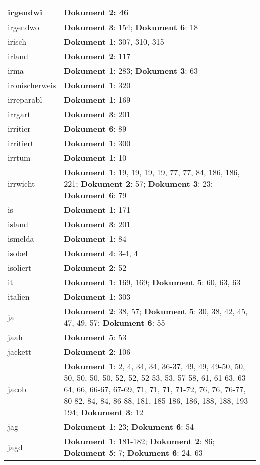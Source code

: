 \documentclass[a5paper]{article}
\begin{document}
\begin{longtable}[l]{|l|p{3in}|}
\hline
irgendwi & \textbf{Dokument 2}: 46 \\
\hline
irgendwo & \textbf{Dokument 3}: 154; \textbf{Dokument 6}: 18 \\
\hline
irisch & \textbf{Dokument 1}: 307, 310, 315 \\
\hline
irland & \textbf{Dokument 2}: 117 \\
\hline
irma & \textbf{Dokument 1}: 283; \textbf{Dokument 3}: 63 \\
\hline
ironischerweis & \textbf{Dokument 1}: 320 \\
\hline
irreparabl & \textbf{Dokument 1}: 169 \\
\hline
irrgart & \textbf{Dokument 3}: 201 \\
\hline
irritier & \textbf{Dokument 6}: 89 \\
\hline
irritiert & \textbf{Dokument 1}: 300 \\
\hline
irrtum & \textbf{Dokument 1}: 10 \\
\hline
irrwicht & \textbf{Dokument 1}: 19, 19, 19, 19, 77, 77, 84, 186, 186, 221; \textbf{Dokument 2}: 57; \textbf{Dokument 3}: 23; \textbf{Dokument 6}: 79 \\
\hline
is & \textbf{Dokument 1}: 171 \\
\hline
island & \textbf{Dokument 3}: 201 \\
\hline
ismelda & \textbf{Dokument 1}: 84 \\
\hline
isobel & \textbf{Dokument 4}: 3-4, 4 \\
\hline
isoliert & \textbf{Dokument 2}: 52 \\
\hline
it & \textbf{Dokument 1}: 169, 169; \textbf{Dokument 5}: 60, 63, 63 \\
\hline
italien & \textbf{Dokument 1}: 303 \\
\hline
ja & \textbf{Dokument 2}: 38, 57; \textbf{Dokument 5}: 30, 38, 42, 45, 47, 49, 57; \textbf{Dokument 6}: 55 \\
\hline
jaah & \textbf{Dokument 5}: 53 \\
\hline
jackett & \textbf{Dokument 2}: 106 \\
\hline
jacob & \textbf{Dokument 1}: 2, 4, 34, 34, 36-37, 49, 49, 49-50, 50, 50, 50, 50, 50, 52, 52, 52-53, 53, 57-58, 61, 61-63, 63-64, 66, 66-67, 67-69, 71, 71, 71, 71-72, 76, 76, 76-77, 80-82, 84, 84, 86-88, 181, 185-186, 186, 188, 188, 193-194; \textbf{Dokument 3}: 12 \\
\hline
jag & \textbf{Dokument 1}: 23; \textbf{Dokument 6}: 54 \\
\hline
jagd & \textbf{Dokument 1}: 181-182; \textbf{Dokument 2}: 86; \textbf{Dokument 5}: 7; \textbf{Dokument 6}: 24, 63 \\

\end{longtable}
\end{document}
